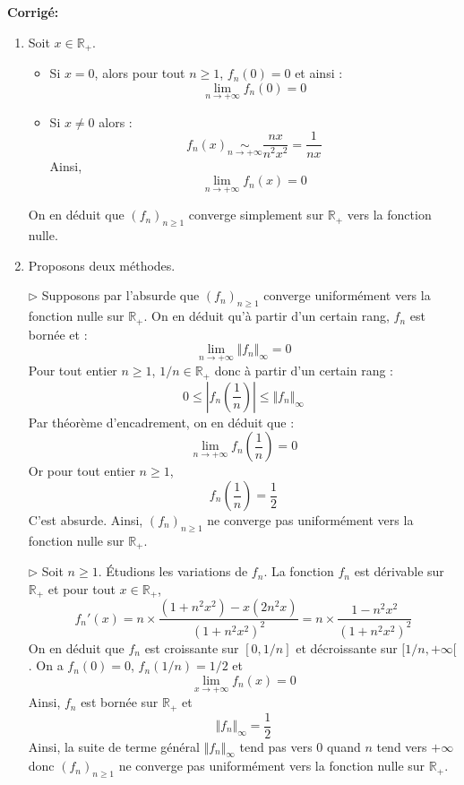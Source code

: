 \documentclass[a4paper,twoside,french,11pt]{VcCours}
\newcommand{\corr}{\textbf{Corrigé:}}
\begin{document}
\corr 

\begin{enumerate}
\item Soit $x \in \mathbb{R}_+$.

\begin{itemize}
\item Si $x=0$, alors pour tout $n \geq 1$, $f_n(0)=0$ et ainsi :
$$ \lim_{n \rightarrow + \infty} f_n(0)=0$$
\item Si $x \neq 0$ alors :
$$ f_n(x) \underset{n \rightarrow + \infty}{\sim} \dfrac{nx}{n^2x^2} = \dfrac{1}{nx}$$
Ainsi,
$$ \lim_{n \rightarrow + \infty} f_n(x) = 0$$
\end{itemize}
On en déduit que $(f_n)_{n \geq 1}$ converge simplement sur $\mathbb{R}_+$ vers la fonction nulle.
\item Proposons deux méthodes.

\medskip

$\rhd$ Supposons par l'absurde que $(f_n)_{n \geq 1}$ converge uniformément vers la fonction nulle sur $\mathbb{R}_+$. On en déduit qu'à partir d'un certain rang, $f_n$ est bornée et :
$$ \lim_{n \rightarrow + \infty} \Vert f_n \Vert_{\infty} = 0$$
Pour tout entier $n \geq 1$, $1/n \in \mathbb{R}_+$ donc à partir d'un certain rang :
$$ 0 \leq \left\vert f_n \left( \dfrac{1}{n} \right) \right\vert \leq \Vert f_n \Vert_{\infty}$$
Par théorème d'encadrement, on en déduit que :
$$ \lim_{n \rightarrow + \infty} f_n \left( \dfrac{1}{n} \right) = 0$$
Or pour tout entier $n \geq 1$,
$$ f_n \left( \dfrac{1}{n} \right) = \dfrac{1}{2}$$
C'est absurde. Ainsi, $(f_n)_{n \geq 1}$ ne converge pas uniformément vers la fonction nulle sur $\mathbb{R}_+$.

\medskip

$\rhd$ Soit $n \geq 1$. Étudions les variations de $f_n$. La fonction $f_n$ est dérivable sur $\mathbb{R}_+$ et pour tout $x \in \mathbb{R}_+$,
$$ f_n'(x) = n \times \dfrac{(1+n^2x^2)-x(2n^2x)}{(1+n^2x^2)^2} = n \times \dfrac{1-n^2x^2}{(1+n^2x^2)^2}$$
On en déduit que $f_n$ est croissante sur $[0,1/n]$ et décroissante sur $[1/n, + \infty[$. On a $f_n(0)=0$, $f_n(1/n)=1/2$ et 
$$ \lim_{x \rightarrow + \infty} f_n(x) = 0$$
Ainsi, $f_n$ est bornée sur $\mathbb{R}_+$ et 
$$ \Vert f_n \Vert_{\infty} = \dfrac{1}{2}$$
Ainsi, la suite de terme général $\Vert f_n \Vert_{\infty}$ tend pas vers $0$ quand $n$ tend vers $+ \infty$ donc $(f_n)_{n \geq 1}$ ne converge pas uniformément vers la fonction nulle sur $\mathbb{R}_+$.

\medskip


\end{enumerate}
\end{document}
